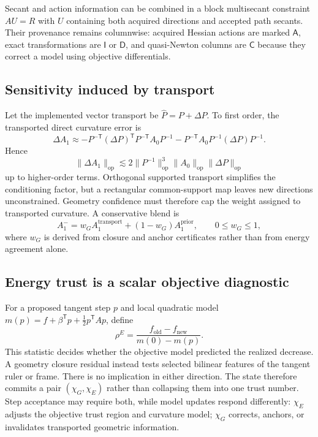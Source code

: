 \documentclass[10pt,twocolumn]{article}
\theoremstyle{definition}
\theoremstyle{remark}
\newcommand{\op}{\mathrm{op}}
\newcommand{\A}{\mathsf A}
\newcommand{\I}{\mathsf I}
\newcommand{\D}{\mathsf D}
\newcommand{\Cor}{\mathsf C}
\begin{document}
Secant and action information can be combined in a block multisecant
constraint $AU=R$ with $U$ containing both acquired directions and accepted
path secants.  Their provenance remains columnwise: acquired Hessian actions
are marked $\A$, exact transformations are $\I$ or $\D$, and quasi-Newton
columns are $\Cor$ because they correct a model using objective differentials.

\subsection{Sensitivity induced by transport}

Let the implemented vector transport be
$\widehat P=P+\Delta P$.  To first order, the transported direct curvature
error is
\begin{equation}
 \Delta A_1
 \approx
 -P^{-\mathsf T}(\Delta P)^{\mathsf T}P^{-\mathsf T}A_0P^{-1}
 -P^{-\mathsf T}A_0P^{-1}(\Delta P)P^{-1}.
 \label{eq:appcurvaturetransporterror}
\end{equation}
Hence
\begin{equation}
 \|\Delta A_1\|_{\op}
 \lesssim
 2\|P^{-1}\|_{\op}^3\|A_0\|_{\op}\|\Delta P\|_{\op}
 \label{eq:appcurvaturetransportbound}
\end{equation}
up to higher-order terms.  Orthogonal supported transport simplifies the
conditioning factor, but a rectangular common-support map leaves new
directions unconstrained.  Geometry confidence must therefore cap the weight
assigned to transported curvature.  A conservative blend is
\begin{equation}
 A^-_1=w_G A_1^{\mathrm{transport}}+(1-w_G)A_1^{\mathrm{prior}},
 \qquad 0\le w_G\le1,
 \label{eq:appblend}
\end{equation}
where $w_G$ is derived from closure and anchor certificates rather than from
energy agreement alone.

\subsection{Energy trust is a scalar objective diagnostic}

For a proposed tangent step $p$ and local quadratic model
$m(p)=f+\beta^{\mathsf T}p+\tfrac12p^{\mathsf T}Ap$, define
\begin{equation}
 \rho^E=
 \frac{f_{\mathrm{old}}-f_{\mathrm{new}}}
 {m(0)-m(p)} .
 \label{eq:appenergyratio}
\end{equation}
This statistic decides whether the objective model predicted the realized
decrease.  A geometry closure residual instead tests selected bilinear
features of the tangent ruler or frame.  There is no implication in either
direction.  The state therefore commits a pair
$(\chi_G,\chi_E)$ rather than collapsing them into one trust number.  Step
acceptance may require both, while model updates respond differently:
$\chi_E$ adjusts the objective trust region and curvature model;
$\chi_G$ corrects, anchors, or invalidates transported geometric information.
\end{document}
